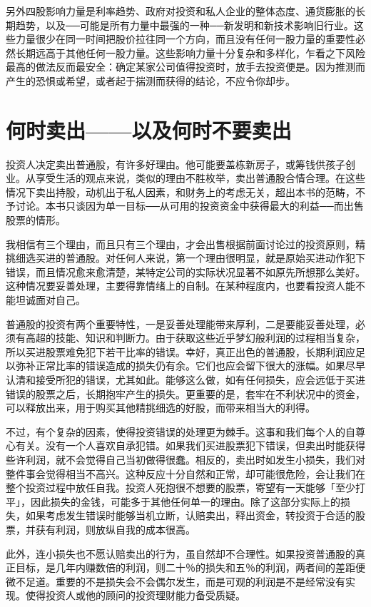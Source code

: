 \documentclass[UTF8,a4paper,zihao=-4,fontset = windows]{ctexart} %
\begin{document}
另外四股影响力量是利率趋势、政府对投资和私人企业的整体态度、通货膨胀的长期趋势，以及──可能是所有力量中最强的一种──新发明和新技术影响旧行业。这些力量很少在同一时间把股价拉往同一个方向，而且没有任何一股力量的重要性必然长期远高于其他任何一股力量。这些影响力量十分复杂和多样化，乍看之下风险最高的做法反而最安全：确定某家公司值得投资时，放手去投资便是。因为推测而产生的恐惧或希望，或者起于揣测而获得的结论，不应令你却步。

\section{何时卖出——以及何时不要卖出}

投资人决定卖出普通股，有许多好理由。他可能要盖栋新房子，或筹钱供孩子创业。从享受生活的观点来说，类似的理由不胜枚举，卖出普通股合情合理。在这些情况下卖出持股，动机出于私人因素，和财务上的考虑无关，超出本书的范畴，不予讨论。本书只谈因为单一目标──从可用的投资资金中获得最大的利益──而出售股票的情形。

我相信有三个理由，而且只有三个理由，才会出售根据前面讨论过的投资原则，精挑细选买进的普通股。对任何人来说，第一个理由很明显，就是原始买进动作犯下错误，而且情况愈来愈清楚，某特定公司的实际状况显著不如原先所想那么美好。这种情况要妥善处理，主要得靠情绪上的自制。在某种程度内，也要看投资人能不能坦诚面对自己。

普通股的投资有两个重要特性，一是妥善处理能带来厚利，二是要能妥善处理，必须有高超的技能、知识和判断力。由于获取这些近乎梦幻般利润的过程相当复杂，所以买进股票难免犯下若干比率的错误。幸好，真正出色的普通股，长期利润应足以弥补正常比率的错误造成的损失仍有余。它们也应会留下很大的涨幅。如果尽早认清和接受所犯的错误，尤其如此。能够这么做，如有任何损失，应会远低于买进错误的股票之后，长期抱牢产生的损失。更重要的是，套牢在不利状况中的资金，可以释放出来，用于购买其他精挑细选的好股，而带来相当大的利得。

不过，有个复杂的因素，使得投资错误的处理更为棘手。这事和我们每个人的自尊心有关。没有一个人喜欢自承犯错。如果我们买进股票犯下错误，但卖出时能获得些许利润，就不会觉得自己当初做得很蠢。相反的，卖出时如发生小损失，我们对整件事会觉得相当不高兴。这种反应十分自然和正常，却可能很危险，会让我们在整个投资过程中放任自我。投资人死抱很不想要的股票，寄望有一天能够「至少打平」，因此损失的金钱，可能多于其他任何单一的理由。除了这部分实际上的损失，如果考虑发生错误时能够当机立断，认赔卖出，释出资金，转投资于合适的股票，并获有利润，则放纵自我的成本很高。

此外，连小损失也不愿认赔卖出的行为，虽自然却不合理性。如果投资普通股的真正目标，是几年内赚数倍的利润，则二十％的损失和五％的利润，两者间的差距便微不足道。重要的不是损失会不会偶尔发生，而是可观的利润是不是经常没有实现。使得投资人或他的顾问的投资理财能力备受质疑。
\end{document}
